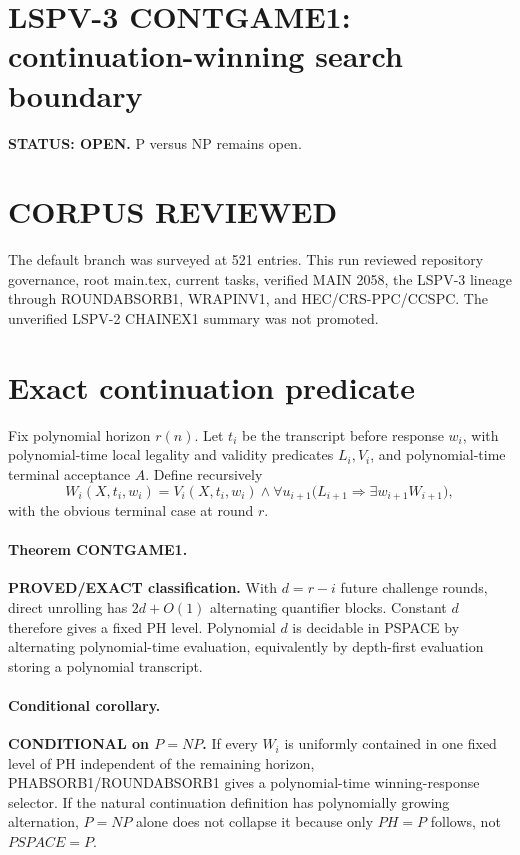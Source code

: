 \documentclass{article}
\begin{document}
\section*{LSPV-3 CONTGAME1: continuation-winning search boundary}
\textbf{STATUS: OPEN.} P versus NP remains open.

\section*{CORPUS REVIEWED}
The default branch was surveyed at 521 entries. This run reviewed repository governance, root main.tex, current tasks, verified MAIN 2058, the LSPV-3 lineage through ROUNDABSORB1, WRAPINV1, and HEC/CRS-PPC/CCSPC. The unverified LSPV-2 CHAINEX1 summary was not promoted.

\section*{Exact continuation predicate}
Fix polynomial horizon \(r(n)\). Let \(t_i\) be the transcript before response \(w_i\), with polynomial-time local legality and validity predicates \(L_i,V_i\), and polynomial-time terminal acceptance \(A\). Define recursively
\[
W_i(X,t_i,w_i)=V_i(X,t_i,w_i)\wedge
\forall u_{i+1}\bigl(L_{i+1}\Rightarrow\exists w_{i+1}W_{i+1}\bigr),
\]
with the obvious terminal case at round \(r\).

\paragraph{Theorem CONTGAME1.}
\textbf{PROVED/EXACT classification.} With \(d=r-i\) future challenge rounds, direct unrolling has \(2d+O(1)\) alternating quantifier blocks. Constant \(d\) therefore gives a fixed PH level. Polynomial \(d\) is decidable in PSPACE by alternating polynomial-time evaluation, equivalently by depth-first evaluation storing a polynomial transcript.

\paragraph{Conditional corollary.}
\textbf{CONDITIONAL on \(P=NP\).} If every \(W_i\) is uniformly contained in one fixed level of PH independent of the remaining horizon, PHABSORB1/ROUNDABSORB1 gives a polynomial-time winning-response selector. If the natural continuation definition has polynomially growing alternation, \(P=NP\) alone does not collapse it because only \(PH=P\) follows, not \(PSPACE=P\).
\end{document}

